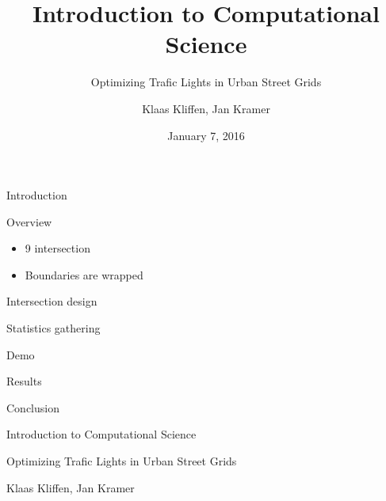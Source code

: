 \documentclass[11pt]{beamer}
\title{Introduction to Computational Science}
\subtitle{Optimizing Trafic Lights in Urban Street Grids}
\author{Klaas Kliffen, Jan Kramer}
\date{January 7, 2016}
\begin{document}
\maketitle

\begin{frame}{Introduction}
\end{frame}

\begin{frame}{Overview}
\begin{itemize}
    \item 9 intersection
    \item Boundaries are wrapped
\end{itemize}
\end{frame}

\begin{frame}{Intersection design}
\end{frame}

\begin{frame}{Statistics gathering}
    
\end{frame}

\begin{frame}{Demo}

\end{frame}

\begin{frame}{Results}
\end{frame}

\begin{frame}{Conclusion}
    
\end{frame}

\begin{frame}{Introduction to Computational Science}
\begin{center}
{\large Optimizing Trafic Lights in Urban Street Grids}\\
\end{center}

\begin{center}
Klaas Kliffen, Jan Kramer
\end{center}

    
\end{frame}
\end{document}
